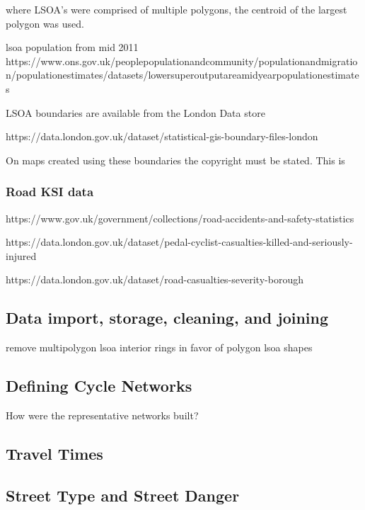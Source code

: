 \documentclass[11pt]{article} %
\begin{document}
where LSOA's were comprised of multiple polygons, the centroid of the largest polygon was used. 

lsoa population from mid 2011 
https://www.ons.gov.uk/peoplepopulationandcommunity/populationandmigration/populationestimates/datasets/lowersuperoutputareamidyearpopulationestimates

LSOA boundaries are available from the London Data store

https://data.london.gov.uk/dataset/statistical-gis-boundary-files-london

On maps created using these boundaries the copyright must be stated. This is

\subsubsection{Road KSI data}

https://www.gov.uk/government/collections/road-accidents-and-safety-statistics

https://data.london.gov.uk/dataset/pedal-cyclist-casualties-killed-and-seriously-injured

https://data.london.gov.uk/dataset/road-casualties-severity-borough

\subsection{Data import, storage, cleaning, and joining}

remove multipolygon lsoa interior rings in favor of polygon lsoa shapes

\subsection{Defining Cycle Networks}

How were the representative networks built? 

\subsection{Travel Times}

\subsection{Street Type and Street Danger}
\end{document}
